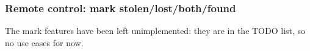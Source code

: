 \subsubsection{Remote control: mark stolen/lost/both/found}
The mark features have been left unimplemented: they are in the TODO list, so no use cases for now.